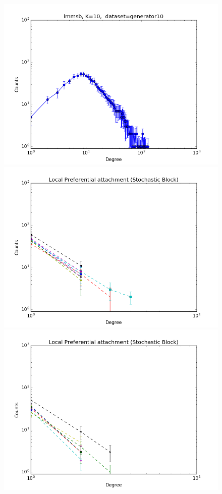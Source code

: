 \documentclass[a4paper, 12pt]{article}
\begin{document}
\begin{figure}[ht]
	\endminipage
	\includegraphics[scale=0.27]{img/expe/3_mmsb/figure_1}
	\endminipage
		\vspace{-0.29cm}
	\includegraphics[scale=0.27]{img/expe/1_mmsb/figure_2}
	\endminipage
	\includegraphics[scale=0.27]{img/expe/2_mmsb/figure_2} 

\end{figure}
\end{document}
